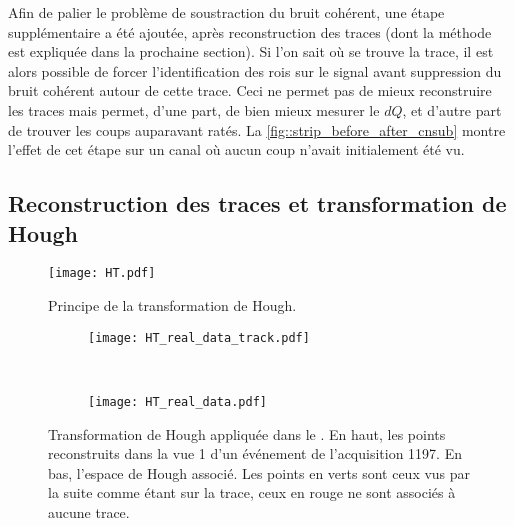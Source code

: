       Afin de palier le problème de soustraction du bruit cohérent, une étape supplémentaire a été ajoutée, après reconstruction des traces (dont la méthode est expliquée dans la prochaine section). Si l'on sait où se trouve la trace, il est alors possible de forcer l'identification des \glspl{roi} sur le signal avant suppression du bruit cohérent autour de cette trace. Ceci ne permet pas de mieux reconstruire les traces mais permet, d'une part, de bien mieux mesurer le $dQ$, et d'autre part de trouver les coups auparavant ratés. La \autoref{fig::strip_before_after_cnsub} montre l'effet de cet étape sur un canal où aucun coup n'avait initialement été vu. %

    \subsection{Reconstruction des traces et transformation de Hough}

      \begin{figure}[htbp]
        \centering
        \texttt{[image: HT.pdf]}
        \caption[Transformation de Hough]{\label{fig::HoughTransformation}Principe de la transformation de Hough.}
      \end{figure}

      \begin{figure}[htbp]
        \centering
        \begin{subfigure}[t]{0.8\textwidth}
          \centering
          \texttt{[image: HT\_real\_data\_track.pdf]}
        \end{subfigure}\\
        \begin{subfigure}[t]{0.48\textwidth}
          \centering
          \texttt{[image: HT\_real\_data.pdf]}
        \end{subfigure}
        \caption[Transformation de Hough dans le \TOO{}]{\label{fig::HT_real_data}Transformation de Hough appliquée dans le \TOO{}. En haut, les points reconstruits dans la vue 1 d'un événement de l'acquisition 1197. En bas, l'espace de Hough associé. Les points en verts sont ceux vus par la suite comme étant sur la trace, ceux en rouge ne sont associés à aucune trace.}
      \end{figure}

